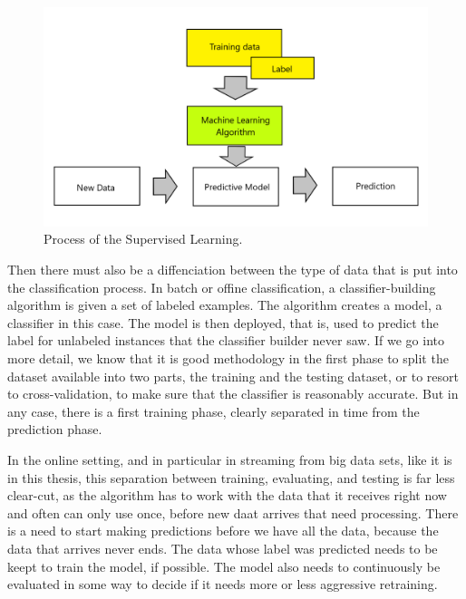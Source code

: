 \documentclass[12pt,oneside,a4paper,parskip]{scrbook}
\begin{document}
\pagebreak

\begin{figure}[H]
  \includegraphics[width=\linewidth]{SL_process_figure}
  \caption{Process of the Supervised Learning. \cite{PythonML}}
  \label{fig:sl_process}
\end{figure}

Then there must also be a diffenciation between the type of data that is put into the classification process.
In batch or offine classification, a classifier-building algorithm is given a set of labeled examples. 
The algorithm creates a model, a classifier in this case. The model is then deployed, that is, used to predict the label 
for unlabeled instances that the classifier builder never saw. If we go into more detail, we know that it is good 
methodology in the first phase to split the dataset available into two parts, the training and the testing dataset, 
or to resort to cross-validation, to make sure that the classifier is reasonably accurate.
But in any case, there is a first training phase, clearly separated in time from the prediction phase.

In the online setting, and in particular in streaming from big data sets, like it is in this thesis, this separation between training, 
evaluating, and testing is far less clear-cut, as the algorithm has to work with the data that it receives right now and often can only use once,
before new daat arrives that need processing.
There is a need to start making predictions before we have all the data, because the data that arrives never ends. 
The data whose label was predicted needs to be keept to train the model, if possible.
The model also needs to continuously be evaluated in some way to decide if it needs more or 
less aggressive retraining. \cite{MLonDataStreams}
\end{document}
